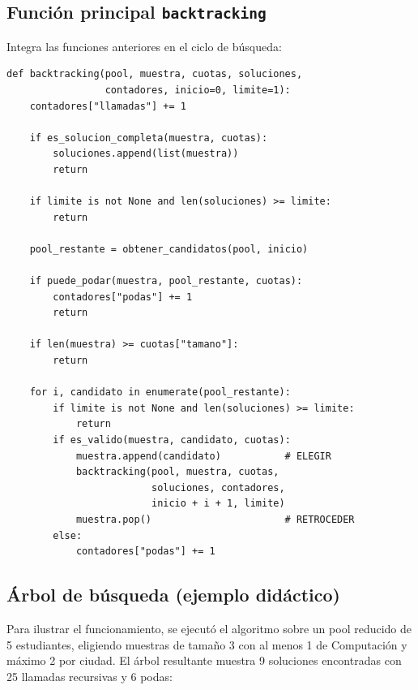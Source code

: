 \documentclass[12pt, a4paper]{article}
\begin{document}
\subsection{Función principal \texttt{backtracking}}

Integra las funciones anteriores en el ciclo de búsqueda:

\begin{lstlisting}[style=python, caption={Algoritmo principal de backtracking}]
def backtracking(pool, muestra, cuotas, soluciones,
                 contadores, inicio=0, limite=1):
    contadores["llamadas"] += 1

    if es_solucion_completa(muestra, cuotas):
        soluciones.append(list(muestra))
        return

    if limite is not None and len(soluciones) >= limite:
        return

    pool_restante = obtener_candidatos(pool, inicio)

    if puede_podar(muestra, pool_restante, cuotas):
        contadores["podas"] += 1
        return

    if len(muestra) >= cuotas["tamano"]:
        return

    for i, candidato in enumerate(pool_restante):
        if limite is not None and len(soluciones) >= limite:
            return
        if es_valido(muestra, candidato, cuotas):
            muestra.append(candidato)           # ELEGIR
            backtracking(pool, muestra, cuotas,
                         soluciones, contadores,
                         inicio + i + 1, limite)
            muestra.pop()                       # RETROCEDER
        else:
            contadores["podas"] += 1
\end{lstlisting}

\subsection{Árbol de búsqueda (ejemplo didáctico)}

Para ilustrar el funcionamiento, se ejecutó el algoritmo sobre un pool reducido de 5 estudiantes, eligiendo muestras de tamaño 3 con al menos 1 de Computación y máximo 2 por ciudad. El árbol resultante muestra 9 soluciones encontradas con 25 llamadas recursivas y 6 podas:
\end{document}
